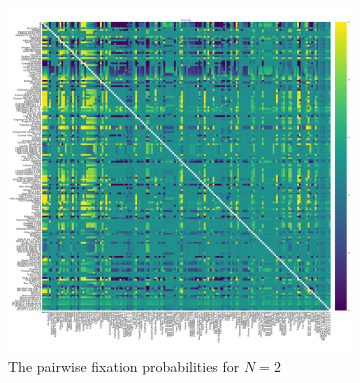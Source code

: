 \documentclass{article}
\begin{document}
\begin{figure}[!hbtp]
    \begin{subfigure}[t]{.4\textwidth}
        \centering
        \includegraphics[width=\textwidth]{./img/fixation_heatmap_2_invade.pdf}
        \caption{The pairwise fixation probabilities for \(N=2\)}
        \label{fig:fixation_heatmap_2}
    \end{subfigure}%
    ~
    \begin{subfigure}[t]{.6\textwidth}
        \centering

\end{subfigure}
\end{figure}
\end{document}
